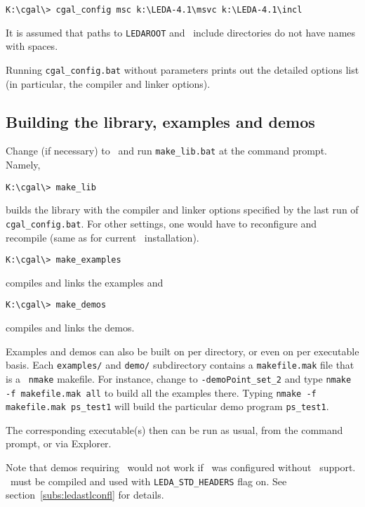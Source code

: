 \begin{verbatim}
K:\cgal\> cgal_config msc k:\LEDA-4.1\msvc k:\LEDA-4.1\incl
\end{verbatim}

It is assumed that paths to \texttt{LEDAROOT} and \leda\ include
directories do not have names with spaces.

Running \texttt{cgal\_config.bat} without parameters prints out the detailed
options list (in particular, the compiler and linker options).


\subsection{Building the library, examples and demos}

Change (if necessary)
to \CGALR\ and run \texttt{make\_lib.bat} at the command prompt. Namely,
\begin{verbatim}
K:\cgal\> make_lib
\end{verbatim}

builds the library with the compiler and linker options specified
by the last run of \texttt{cgal\_config.bat}.
For other settings, one would have to reconfigure and recompile
(same as for current \leda\ installation).
\begin{verbatim}
K:\cgal\> make_examples
\end{verbatim}
compiles and links the examples and
\begin{verbatim}
K:\cgal\> make_demos
\end{verbatim}
compiles and links the demos. 

Examples and demos can also be built on per directory, or even on per
executable basis.  Each \texttt{examples/} and \texttt{demo/}
subdirectory contains a \texttt{makefile.mak} file that is a \mswin\ 
\texttt{nmake} makefile.  For instance, change to
\texttt{\cgal-\cgalrelease\bslsh demo\bslsh Point\_set\_2} and type
\texttt{nmake -f makefile.mak all} to build all the examples there.
Typing \texttt{nmake -f makefile.mak ps\_test1} will build the
particular demo program \texttt{ps\_test1}.

The corresponding executable(s) then can be run as usual, from the
command prompt, or via Explorer.

Note that demos requiring \leda\ would not work if \cgal\ was
configured without \leda\ support.  \leda\ must be compiled and used
with \texttt{LEDA\_STD\_HEADERS} flag on. See
section~\ref{subs:ledastlconfl} for details.


